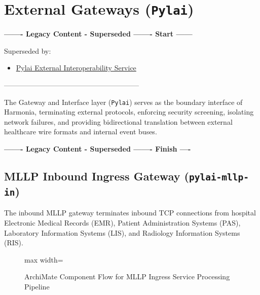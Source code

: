 
\chapter{External Gateways (\texttt{Pylai})}
\label{chap:gateways_pylai}

\par\noindent\textbf{------- Legacy Content - Superseded ------- Start ------}
\par\noindent Superseded by:
\begin{itemize}
  \item \href{../../markdown/05-information-systems-architecture/pylai-external-interoperability.md\#pylai-responsibility}{Pylai External Interoperability Service}
\end{itemize}
\noindent ---------------------------------------------------------

The Gateway and Interface layer (\texttt{Pylai}) serves as the boundary interface of Harmonia, terminating external protocols, enforcing security screening, isolating network failures, and providing bidirectional translation between external healthcare wire formats and internal event buses.


\par\noindent\textbf{------- Legacy Content - Superseded ------- Finish ----}

\section{MLLP Inbound Ingress Gateway (\texttt{pylai-mllp-in})}

The inbound MLLP gateway terminates inbound TCP connections from hospital Electronic Medical Records (EMR), Patient Administration Systems (PAS), Laboratory Information Systems (LIS), and Radiology Information Systems (RIS).

\begin{figure}[htbp]
    \centering
    \begin{adjustbox}{max width=\textwidth}
        
    \end{adjustbox}
    \caption{ArchiMate Component Flow for MLLP Ingress Service Processing Pipeline}
    \label{fig:pylai_mllp_ingress_process}
\end{figure}

